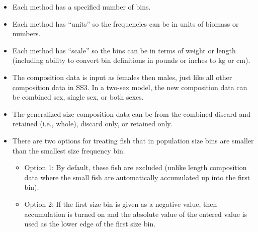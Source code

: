 \begin{itemize}
	\item Each method has a specified number of bins.
	\item Each method has ``units'' so the frequencies can be in units of biomass or numbers.
	\item Each method has ``scale'' so the bins can be in terms of weight or length (including ability to convert bin definitions in pounds or inches to kg or cm). 
	\item The composition data is input as females then males, just like all other composition data in SS3. In a two-sex model, the new composition data can be combined sex, single sex, or both sexes.
	\item The generalized size composition data can be from the combined discard and retained (i.e., whole), discard only, or retained only.
	\item There are two options for treating fish that in population size bins are smaller than the smallest size frequency bin.
	\begin{itemize}
		\item Option 1: By default, these fish are excluded (unlike length composition data where the small fish are automatically accumulated up into the first bin).
		\item Option 2: If the first size bin is given as a negative value, then accumulation is turned on and the absolute value of the entered value is used as the lower edge of the first size bin.
	\end{itemize}
\end{itemize}

